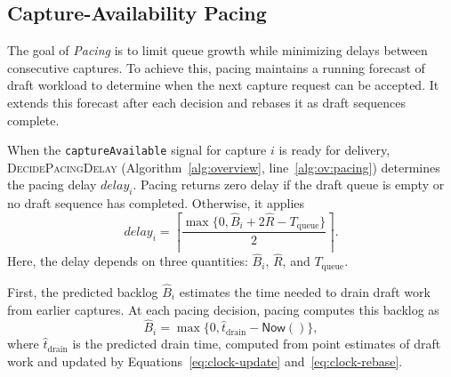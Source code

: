 \subsection{Capture-Availability Pacing}
\label{sec:pacing}

The goal of \emph{Pacing} is to limit queue growth while minimizing delays between consecutive captures.
To achieve this, pacing maintains a running forecast of draft workload to determine when the next capture request can be accepted.
It extends this forecast after each decision and rebases it as draft sequences complete.

When the \texttt{captureAvailable} signal for capture \(i\) is ready for delivery, \textsc{DecidePacingDelay} (Algorithm~\ref{alg:overview}, line~\ref{alg:ov:pacing}) determines the pacing delay \(\mathit{delay}_i\).
Pacing returns zero delay if the draft queue is empty or no draft sequence has completed.
Otherwise, it applies
\begin{equation*}
  \mathit{delay}_i
  =
  \left\lceil
    \frac{
      \max\{0,\hat B_i+2\hat R-T_{\mathrm{queue}}\}
    }{2}
  \right\rceil.
\end{equation*}
Here, the delay depends on three quantities: \(\hat B_i\), \(\hat R\), and \(T_{\mathrm{queue}}\).

First, the predicted backlog \(\hat B_i\) estimates the time needed to drain draft work from earlier captures.
At each pacing decision, pacing computes this backlog as
\begin{equation*}
  \hat B_i
  =
  \max\{0,\hat t_{\mathrm{drain}}-\textsf{Now}()\},
\end{equation*}
where \(\hat t_{\mathrm{drain}}\) is the predicted drain time, computed from point estimates of draft work and updated by Equations~\eqref{eq:clock-update} and~\eqref{eq:clock-rebase}.

